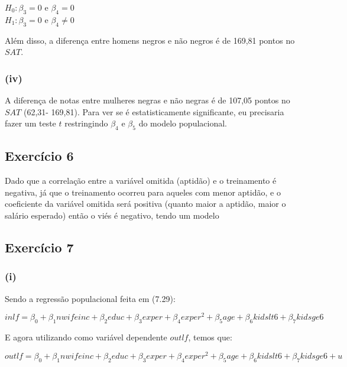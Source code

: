 \documentclass[hidelinks,11pt]{book}
\theoremstyle{definition}
\begin{document}
\begin{center}
	$H_0 : \beta_{3} = 0$ e $\beta_{4} = 0$\\
	$H_1 : \beta_{3} = 0$ e $\beta_{4} \not = 0$
\end{center}

Além disso, a diferença entre homens negros e não negros é de 169,81 pontos no $SAT$.


\subsubsection*{(iv)}

A diferença de notas entre mulheres negras e não negras é de 107,05 pontos no $SAT$ (62,31- 169,81). Para ver se é estatisticamente significante, eu precisaria fazer um teste $t$ restringindo $\beta_4$ e $\beta_5$ do modelo populacional.
	
\subsection*{Exercício 6}

Dado que a correlação entre a variável omitida (aptidão) e o treinamento é negativa, já que o treinamento ocorreu para aqueles com menor aptidão, e o coeficiente da variável omitida será positiva (quanto maior a aptidão, maior o salário esperado) então o viés é negativo, tendo um modelo 


\subsection*{Exercício 7}

\subsubsection*{(i)}


Sendo a regressão populacional feita em (7.29):

\begin{displaymath}
	inlf = \beta_0 + \beta_1 nwifeinc + \beta_2 educ + \beta_3 exper + \beta_4 exper^2 + \beta_5 age + \beta_6 kidslt6 + \beta_7 kidsge6
\end{displaymath}

E agora utilizando como variável dependente $outlf$, temos que:

\begin{displaymath}
	outlf = \beta_0 + \beta_1 nwifeinc + \beta_2 educ + \beta_3 exper + \beta_4 exper^2 + \beta_5 age + \beta_6 kidslt6 + \beta_7 kidsge6 + u
\end{displaymath}
\end{document}
